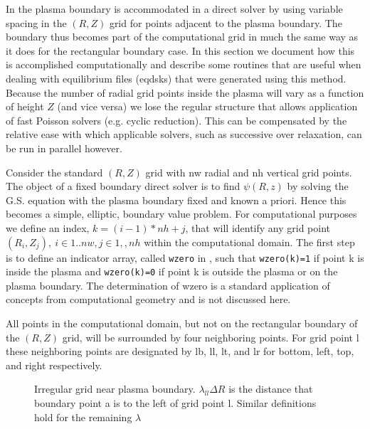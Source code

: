 In \ot the plasma boundary is accommodated in a direct solver by using variable
spacing in the $(R,Z) $ grid for points adjacent to the plasma boundary. The
boundary thus becomes part of the computational grid in much the same way as it
does for the rectangular boundary case. In this section we document how this is
accomplished computationally and describe some routines that are useful when
dealing with equilibrium files (eqdsks) that were generated using this method.
Because the number of radial grid points inside the plasma will vary as a
function of height $Z$ (and vice versa) we lose the  regular structure that
allows application of fast Poisson solvers (e.g. cyclic reduction). This can be
compensated by the relative ease with which  applicable solvers, such as
successive over relaxation, can be run in parallel however.  

Consider the standard $(R,Z)$ grid with nw radial and nh vertical grid points.
The object of a fixed boundary direct solver is to find $\psi(R,z) $ by solving
the G.S. equation with the plasma boundary fixed and known a priori. Hence this
becomes a simple, elliptic, boundary value problem. For computational purposes
we define an index, $k= (i-1)*nh + j $, that will identify any grid point
$(R_i,Z_j),\  i \in 1..nw, j \in 1,,nh $ within the computational domain. The
first step is to define an indicator array, called \texttt{wzero} in \ot, such
that \texttt{wzero(k)=1} if point k is inside the plasma and 
\texttt{wzero(k)=0} if point k is outside the plasma or on the plasma
boundary. The determination  of wzero is a standard application of concepts from
computational geometry and is not discussed here.

All points in the computational domain, but not on the rectangular boundary of
the $(R,Z)$ grid, will be surrounded by four neighboring points. For grid point
l these neighboring points are designated by lb, ll, lt, and lr for bottom,
left, top, and right respectively.
\begin{figure}[hbt] %
 \centering 
 \begin{narrow}{-.50in}{0in}   
  \mbox{}
  \caption{Irregular grid near plasma boundary. $\lambda_{ll}\Delta R$
  is the distance that boundary point a is to the left of grid point l. Similar
  definitions hold for the remaining $\lambda$}
 \end{narrow} 
 \label{mhd:f1}
\end{figure}

